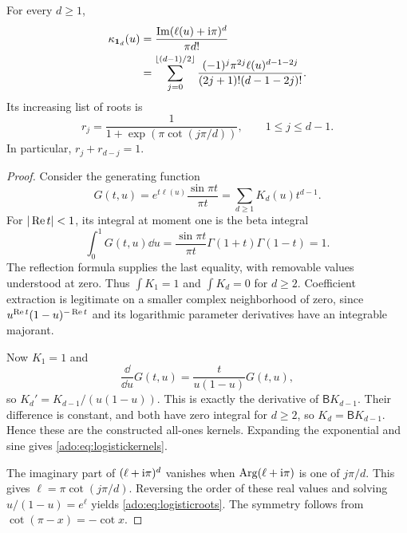 \begin{theorem}
\label{ado:thm:logistickernels}
For every $d\ge1$,
\begin{align}
 \kappa_{\boldsymbol{1}_d}(u)
 &=\frac{\operatorname{Im}(\ell(u)+\mathrm{i}\pi)^d}{\pi d!}\notag\\
 &=\sum_{j=0}^{\lfloor(d-1)/2\rfloor}
 \frac{(-1)^j\pi^{2j}\ell(u)^{d-1-2j}}
 {(2j+1)!(d-1-2j)!}.
 \label{ado:eq:logistickernels}
\end{align}
Its increasing list of roots is
\begin{equation}\label{ado:eq:logisticroots}
 r_j=\frac1{1+\exp(\pi\cot(j\pi/d))},
 \qquad 1\le j\le d-1.
\end{equation}
In particular, $r_j+r_{d-j}=1$.
\end{theorem}
\begin{proof}
Consider the generating function
\begin{equation}\label{ado:eq:kernelgenerator}
 G(t,u)=e^{t\ell(u)}\frac{\sin\pi t}{\pi t}
       =\sum_{d\ge1}K_d(u)t^{d-1}.
\end{equation}
For $|\operatorname{Re} t|<1$, its integral at moment one is the beta integral
\[
 \int_0^1G(t,u)\dd u
 =\frac{\sin\pi t}{\pi t}\Gamma(1+t)\Gamma(1-t)=1.
\]
The reflection formula supplies the last equality, with removable values
understood at zero. Thus $\int K_1=1$ and $\int K_d=0$ for $d\ge2$.
Coefficient extraction is legitimate on a smaller complex neighborhood
of zero, since $u^{\operatorname{Re} t}(1-u)^{-\operatorname{Re} t}$ and its logarithmic
parameter derivatives have an integrable majorant.

Now $K_1=1$ and
\[
 \frac{\dd}{\dd u}G(t,u)=\frac{t}{u(1-u)}G(t,u),
\]
so $K_d'=K_{d-1}/(u(1-u))$. This is exactly the derivative of
$\mathsf{B} K_{d-1}$. Their difference is constant, and both have zero
integral for $d\ge2$, so $K_d=\mathsf{B} K_{d-1}$. Hence these are the
constructed all-ones kernels. Expanding the exponential and sine gives
\eqref{ado:eq:logistickernels}.

The imaginary part of $(\ell+\mathrm{i}\pi)^d$ vanishes when
$\operatorname{Arg}(\ell+\mathrm{i}\pi)$ is one of $j\pi/d$. This gives
$\ell=\pi\cot(j\pi/d)$. Reversing the order of these real values
and solving $u/(1-u)=e^\ell$ yields \eqref{ado:eq:logisticroots}.
The symmetry follows from $\cot(\pi-x)=-\cot x$.
\end{proof}

